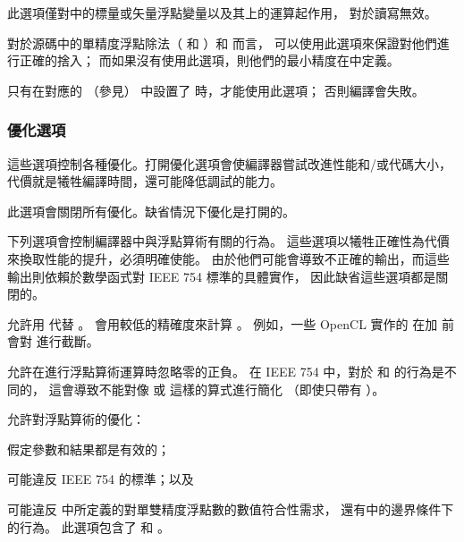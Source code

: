 此選項僅對中的標量或矢量浮點變量以及其上的運算起作用，
對於讀寫無效。
\stopclOption

對於源碼中的單精度浮點除法（  和  ）和  而言，
可以使用此選項來保證對他們進行正確的捨入；
而如果沒有使用此選項，則他們的最小精度在中定義。

只有在對應的  （參見）
中設置了  時，才能使用此選項；
否則編譯會失敗。
\stopclOption

\subsubsection[sec:OptimizationOption]{優化選項}

這些選項控制各種優化。打開優化選項會使編譯器嘗試改進性能和/或代碼大小，
代價就是犧牲編譯時間，還可能降低調試的能力。

此選項會關閉所有優化。缺省情況下優化是打開的。
\stopclOption

下列選項會控制編譯器中與浮點算術有關的行為。
這些選項以犧牲正確性為代價來換取性能的提升，必須明確使能。
由於他們可能會導致不正確的輸出，而這些輸出則依賴於數學函式對 IEEE 754 標準的具體實作，
因此缺省這些選項都是關閉的。

允許用  代替 。
  會用較低的精確度來計算 。
例如，一些 OpenCL 實作的  在加  前會對  進行截斷。
\stopclOption

允許在進行浮點算術運算時忽略零的正負。
在 IEEE 754 中，對於  和  的行為是不同的，
這會導致不能對像  或  這樣的算式進行簡化
（即使只帶有  ）。
\stopclOption

允許對浮點算術的優化：
\startigBase
\item 假定參數和結果都是有效的；
\item 可能違反 IEEE 754 的標準；以及
\item 可能違反 中所定義的對單雙精度浮點數的數值符合性需求，
還有中的邊界條件下的行為。
\stopigBase
此選項包含了  和 。
\stopclOption

